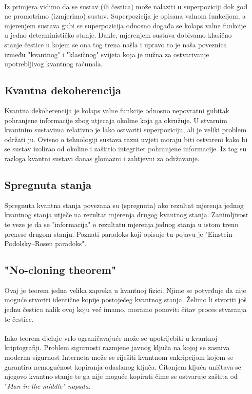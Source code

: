 \documentclass[times, utf8, zavrsni, numeric]{fer}
\begin{document}
\paragraph{}
Iz primjera vidimo da se sustav (ili čestica) može nalaziti u superpoziciji dok god ne promotrimo (izmjerimo) sustav. Superpozicija je opisana valnom funkcijom, a mjerenjem sustava gubi se superpozicija odnosno događa se kolaps valne funkcije u jedno determinističko stanje. Dakle, mjerenjem sustava dobivamo klasično stanje čestice u kojem se ona tog trena našla i upravo to je naša poveznica između "kvantnog" i "klasičnog" svijeta koja je nužna za ostvarivanje upotrebljivog kvantnog računala.

\subsection{Kvantna dekoherencija}
Kvantna dekoherencija je kolaps valne funkcije odnosno nepovratni gubitak pohranjene informacije zbog utjecaja okoline koja ga okružuje.
U stvarnim kvantnim sustavima relativno je lako ostvariti superpoziciju, ali je veliki problem održati ju. Ovisno o tehnologiji sustava razni uvjeti moraju biti ostvareni kako bi se sustav izolirao od okoline i zaštitio integritet pohranjene informacije. Iz tog su razloga kvantni sustavi danas glomazni i zahtjevni za održavanje.

\subsection{Spregnuta stanja }
Spregnuta kvantna stanja povezana su (spregnuta) ako rezultat mjerenja jednog kvantnog stanja utječe na rezultat mjerenja drugog kvantnog stanja. Zanimljivost te veze je da se "informacija" o rezultatu mjerenja jednog stanja u istom trenu prenese drugom stanju. Poznati paradoks koji opisuje tu pojavu je "Einstein–Podolsky–Rosen paradoks".

\subsection{"No-cloning theorem"}
Ovaj je teorem jedna velika zapreka u kvantnoj fizici. 
Njime se potvrđuje da nije moguće stvoriti identične kopije postojećeg kvantnog stanja. Želimo li stvoriti još jednu česticu nalik ovoj koju već imamo, moramo ponoviti čitav proces stvaranja te čestice. \cite{q_history}

\paragraph{}
Iako teorem djeluje vrlo ograničavajuće može se upotrijebiti u kvantnoj kriptografiji. Problem sigurnosti razmjene javnog ključa na kojoj se zasniva moderna sigurnost Interneta može se riješiti kvantnom enkripcijom kojom se garantira nemogućnost kopiranja odaslanog ključa. Čitanjem ključa uništava se njegovo kvantno stanje te ga nije moguće kopirati čime se ostvaruje zaštita od "\it Man-in-the-middle\rm" napada. \citep{han_phd}
\end{document}
